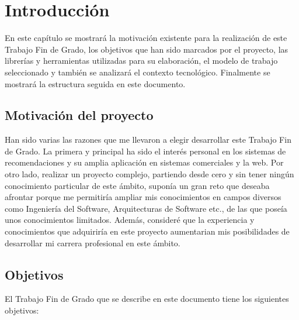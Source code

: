 \chapter{Introducción}
\thispagestyle{empty}

En este capítulo se mostrará la motivación existente para la realización de este Trabajo Fin de Grado, los objetivos que han sido marcados por el proyecto, las librerías y herramientas utilizadas para su elaboración, el modelo de trabajo seleccionado y también se analizará el contexto tecnológico. Finalmente se mostrará la estructura seguida en este documento.

\section{Motivación del proyecto}
\thispagestyle{empty}


Han sido varias las razones que me llevaron a elegir desarrollar este Trabajo Fin de Grado. La primera y principal ha sido el interés personal en los sistemas de recomendaciones y su amplia aplicación en sistemas comerciales y la web. Por otro lado, realizar un proyecto complejo, partiendo desde cero y sin tener ningún conocimiento particular de este ámbito, suponía un gran reto que deseaba afrontar porque me permitiría ampliar mis conocimientos en campos diversos como Ingeniería del Software, Arquitecturas de Software etc., de las que poseía unos conocimientos limitados. Además, consideré que la experiencia y conocimientos que adquiriría en este proyecto aumentarian mis posibilidades de desarrollar mi carrera profesional en este ámbito.

\section{Objetivos}
\thispagestyle{empty}


El Trabajo Fin de Grado que se describe en este documento tiene los siguientes objetivos:

